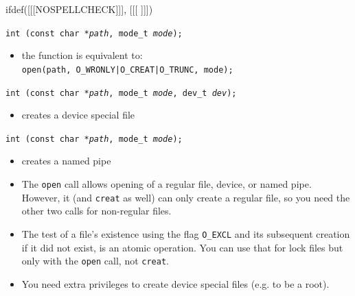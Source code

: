 
ifdef([[[NOSPELLCHECK]]], [[[
]]])

\begin{slide}
\texttt{int (const char *\emph{path}, mode\_t \emph{mode});}
\begin{itemize}
\item the function is equivalent to:\\
\texttt{open(path, O\_WRONLY|O\_CREAT|O\_TRUNC, mode);}
\end{itemize}
\texttt{int (const char *\emph{path}, mode\_t \emph{mode},
dev\_t \emph{dev});}
\begin{itemize}
\item creates a device special file
\end{itemize}
\texttt{int (const char *\emph{path}, mode\_t \emph{mode});} 
\begin{itemize}
\item creates a named pipe
\end{itemize}
\end{slide}

\label{MKFIFO}
\label{CREAT}

\begin{itemize}
\item The \texttt{open} call allows opening of a regular file, device, or named
pipe.  However, it (and \texttt{creat} as well) can only create a regular file,
so you need the other two calls for non-regular files.
\item The test of a file's existence using the flag \texttt{O\_EXCL} and its
subsequent creation if it did not exist, is an atomic operation.  You can use
that for lock files but only with the \texttt{open} call, not \texttt{creat}.
\item You need extra privileges to create device special files (e.g. to be a
root).
\end{itemize}




